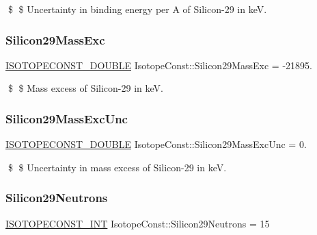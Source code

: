 \$ \$ Uncertainty in binding energy per A of Silicon-\/29 in keV. \mbox{\label{group___isotope_const-_silicon-_si29_gad9193498f0dc98d0a7ef27ee801a5be2}} 
\subsubsection{\texorpdfstring{Silicon29\+Mass\+Exc}{Silicon29MassExc}}
{\footnotesize\ttfamily \mbox{\hyperlink{group___isotope_const-_macros_ga8f45a7272ce02c0b4c65c44636ed719a}{I\+S\+O\+T\+O\+P\+E\+C\+O\+N\+S\+T\+\_\+\+D\+O\+U\+B\+LE}} Isotope\+Const\+::\+Silicon29\+Mass\+Exc = -\/21895.}

\$ \$ Mass excess of Silicon-\/29 in keV. \mbox{\label{group___isotope_const-_silicon-_si29_ga0aadaf61278e378b84f3b164918e49bd}} 
\subsubsection{\texorpdfstring{Silicon29\+Mass\+Exc\+Unc}{Silicon29MassExcUnc}}
{\footnotesize\ttfamily \mbox{\hyperlink{group___isotope_const-_macros_ga8f45a7272ce02c0b4c65c44636ed719a}{I\+S\+O\+T\+O\+P\+E\+C\+O\+N\+S\+T\+\_\+\+D\+O\+U\+B\+LE}} Isotope\+Const\+::\+Silicon29\+Mass\+Exc\+Unc = 0.}

\$ \$ Uncertainty in mass excess of Silicon-\/29 in keV. \mbox{\label{group___isotope_const-_silicon-_si29_ga2ef1c48cb6609d20f783412d6c0e50f2}} 
\subsubsection{\texorpdfstring{Silicon29\+Neutrons}{Silicon29Neutrons}}
{\footnotesize\ttfamily \mbox{\hyperlink{group___isotope_const-_macros_ga5f18360b3e99483a35c32d789e62621c}{I\+S\+O\+T\+O\+P\+E\+C\+O\+N\+S\+T\+\_\+\+I\+NT}} Isotope\+Const\+::\+Silicon29\+Neutrons = 15}

